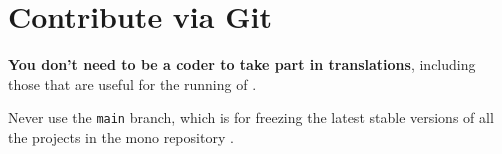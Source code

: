 \documentclass{tutodoc}
\begin{document}
\section{Contribute via Git}

\begin{tdocnote}
    \textbf{You don't need to be a coder to take part in translations}, including those that are useful for the running of \thisproj.
\end{tdocnote}


\begin{tdoccaut}
    Never use the \verb#main# branch, which is for freezing the latest stable versions of all the projects in the mono repository \thismonorepo.
\end{tdoccaut}
\end{document}
